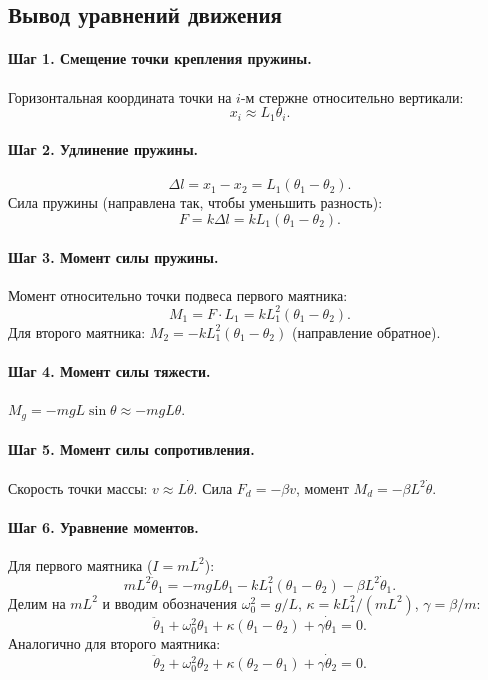 \documentclass[12pt,a4paper]{article}
\begin{document}
\subsection{Вывод уравнений движения}

\paragraph{Шаг 1. Смещение точки крепления пружины.}
Горизонтальная координата точки на \(i\)-м стержне относительно вертикали:
\[
x_i \approx L_1\theta_i.
\]

\paragraph{Шаг 2. Удлинение пружины.}
\[
\Delta l = x_1 - x_2 = L_1(\theta_1-\theta_2).
\]
Сила пружины (направлена так, чтобы уменьшить разность):
\[
F = k\Delta l = kL_1(\theta_1-\theta_2).
\]

\paragraph{Шаг 3. Момент силы пружины.}
Момент относительно точки подвеса первого маятника:
\[
M_1 = F\cdot L_1 = kL_1^2(\theta_1-\theta_2).
\]
Для второго маятника: \(M_2 = -kL_1^2(\theta_1-\theta_2)\) (направление обратное).

\paragraph{Шаг 4. Момент силы тяжести.}
\(M_g = -mgL\sin\theta \approx -mgL\theta\).

\paragraph{Шаг 5. Момент силы сопротивления.}
Скорость точки массы: \(v\approx L\dot\theta\). Сила \(F_d=-\beta v\), момент
\(M_d = -\beta L^2\dot\theta\).

\paragraph{Шаг 6. Уравнение моментов.}
Для первого маятника (\(I=mL^2\)):
\[
mL^2\ddot\theta_1 = -mgL\theta_1 - kL_1^2(\theta_1-\theta_2) - \beta L^2\dot\theta_1.
\]
Делим на \(mL^2\) и вводим обозначения
\(\omega_0^2=g/L\), \(\kappa=kL_1^2/(mL^2)\), \(\gamma=\beta/m\):
\begin{equation}\label{eq:theta1}
\ddot\theta_1 + \omega_0^2\theta_1 + \kappa(\theta_1-\theta_2) + \gamma\dot\theta_1 = 0.
\end{equation}
Аналогично для второго маятника:
\begin{equation}\label{eq:theta2}
\ddot\theta_2 + \omega_0^2\theta_2 + \kappa(\theta_2-\theta_1) + \gamma\dot\theta_2 = 0.
\end{equation}
\end{document}
